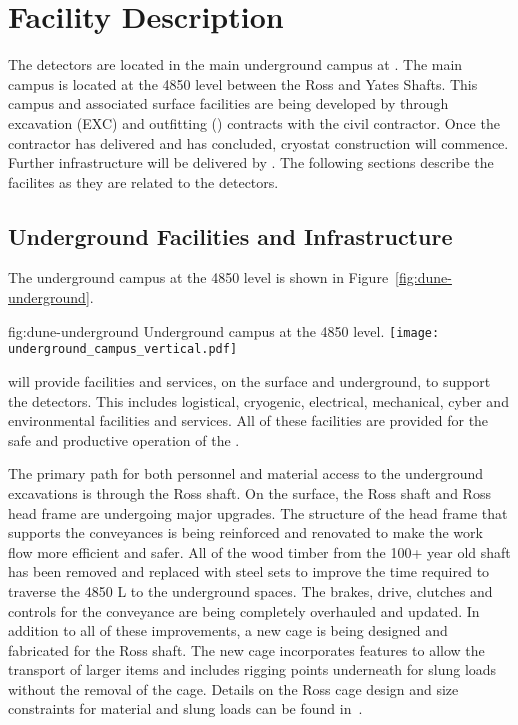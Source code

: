 \chapter{Facility Description}
\label{vl:tc-facility}

The  detectors are located in the main underground campus
at . The main campus is located at the 4850 level between
the Ross and Yates Shafts. This campus and associated surface
facilities are being developed by  through excavation
(EXC) and outfitting () contracts with the civil
contractor. Once the contractor has delivered and  has
concluded, cryostat construction will commence. Further infrastructure
will be delivered by .  The following sections describe
the facilites as they are related to the  detectors.

\section{Underground Facilities and Infrastructure}
\label{sec:fdsp-coord-uderground-excavation}

The  underground campus at the  4850 level is shown in
Figure~\ref{fig:dune-underground}.
\begin{dunefigure}{fig:dune-underground}
  {Underground campus at the 4850 level.}
  \texttt{[image: underground\_campus\_vertical.pdf]}
\end{dunefigure}
 will provide facilities and services, on the surface and
underground, to support the  detectors.  This includes
logistical, cryogenic, electrical, mechanical, cyber and environmental
facilities and services.  All of these facilities are provided for the
safe and productive operation of the .

The primary path for both personnel and material access to the
underground excavations is through the Ross shaft. On the surface, the
Ross shaft and Ross head frame are undergoing major upgrades. The
structure of the head frame that supports the conveyances is being
reinforced and renovated to make the work flow more efficient and
safer.  All of the wood timber from the 100+ year old shaft has been
removed and replaced with steel sets to improve the time required to
traverse the 4850 L to the underground spaces.  The brakes, drive,
clutches and controls for the conveyance are being completely
overhauled and updated.  In addition to all of these improvements, a
new cage is being designed and fabricated for the Ross shaft.  The new
cage incorporates features to allow the transport of larger items and
includes rigging points underneath for slung loads without the removal
of the cage.  Details on the Ross cage design and size constraints for
material and slung loads can be found in~.

